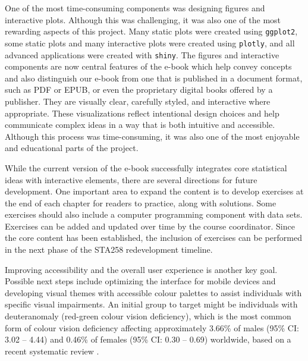 \documentclass[11pt]{article}
\begin{document}
One of the most time-consuming components was designing figures and interactive plots. 
Although this was challenging, it was also one of the most rewarding aspects of this project.
Many static plots were created using \texttt{ggplot2}, some static plots and many interactive plots were created using \texttt{plotly}, 
and all advanced applications were created with \texttt{shiny}. 
The figures and interactive components are now central features of the e-book which help convey concepts and also distinguish our e-book from one that is published in a document format, such as PDF or EPUB, or even the proprietary digital books offered by a publisher.
They are visually clear, carefully styled, and interactive where appropriate. These visualizations reflect intentional design choices and help communicate complex ideas in a way that is both intuitive and accessible. Although this process was time-consuming, it was also one of the most enjoyable and educational parts of the project.


While the current version of the e-book successfully integrates core statistical ideas with interactive elements, there are several directions for future development. 
One important area to expand the content is to develop exercises at the end of each chapter for readers to practice, along with solutions.
Some exercises should also include a computer programming component with data sets.
Exercises can be added and updated over time by the course coordinator.
Since the core content has been established, the inclusion of exercises can be performed in the next phase of the STA258 redevelopment timeline.


Improving accessibility and the overall user experience is another key goal. 
Possible next steps include optimizing the interface for mobile devices and developing visual themes with accessible colour palettes to assist individuals with specific visual impairments. 
An initial group to target might be individuals with deuteranomaly (red-green colour vision deficiency), which is the most common form of colour vision deficiency affecting approximately 3.66\% of males (95\% CI: 3.02 -- 4.44) and 0.46\% of females (95\% CI: 0.30 -- 0.69) worldwide, based on a recent systematic review \cite{Jeong2025}.
\end{document}
